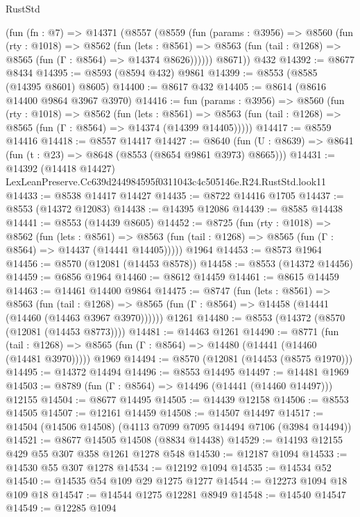 \begin{lexlean}{RustStd}
\begin{coremodule}
    (fun (fn : @7) =>
    @14371
      (@8557
        (@8559
          (fun (params : @3956) =>
          @8560
            (fun (rty : @1018) =>
            @8562
              (fun (lets : @8561) =>
              @8563 (fun (tail : @1268) => @8565 (fun (Γ : @8564) => @14374 @8626))))))
        @8671))
    @432
@14392 := @8677 @8434
@14395 := @8593 (@8594 @432) @9861
@14399 := @8553 (@8585 (@14395 @8601) @8605)
@14400 := @8617 @432
@14405 := @8614 (@8616 @14400 @9864 @3967 @3970)
@14416 := fun (params : @3956) =>
  @8560
    (fun (rty : @1018) =>
    @8562
      (fun (lets : @8561) =>
      @8563 (fun (tail : @1268) => @8565 (fun (Γ : @8564) => @14374 (@14399 @14405)))))
@14417 := @8559 @14416
@14418 := @8557 @14417
@14427 := @8640
    (fun (U : @8639) => @8641 (fun (t : @23) => @8648 (@8553 (@8654 @9861 @3973) @8665)))
@14431 := @14392
    (@14418 @14427)
    LexLeanPreserve.Cc639d244984595f0311043c4c505146e.R24.RustStd.look11
@14433 := @8538 @14417 @14427
@14435 := @8722 @14416 @1705
@14437 := @8553 (@14372 @12083)
@14438 := @14395 @12086
@14439 := @8585 @14438
@14441 := @8553 (@14439 @8605)
@14452 := @8725
    (fun (rty : @1018) =>
    @8562
      (fun (lets : @8561) =>
      @8563 (fun (tail : @1268) => @8565 (fun (Γ : @8564) => @14437 (@14441 @14405)))))
    @1964
@14453 := @8573 @1964
@14456 := @8570 (@12081 (@14453 @8578))
@14458 := @8553 (@14372 @14456)
@14459 := @6856 @1964
@14460 := @8612 @14459
@14461 := @8615 @14459
@14463 := @14461 @14400 @9864
@14475 := @8747
    (fun (lets : @8561) =>
    @8563
      (fun (tail : @1268) =>
      @8565 (fun (Γ : @8564) => @14458 (@14441 (@14460 (@14463 @3967 @3970))))))
    @1261
@14480 := @8553 (@14372 (@8570 (@12081 (@14453 @8773))))
@14481 := @14463 @1261
@14490 := @8771
    (fun (tail : @1268) => @8565 (fun (Γ : @8564) => @14480 (@14441 (@14460 (@14481 @3970)))))
    @1969
@14494 := @8570 (@12081 (@14453 (@8575 @1970)))
@14495 := @14372 @14494
@14496 := @8553 @14495
@14497 := @14481 @1969
@14503 := @8789 (fun (Γ : @8564) => @14496 (@14441 (@14460 @14497))) @12155
@14504 := @8677 @14495
@14505 := @14439 @12158
@14506 := @8553 @14505
@14507 := @12161 @14459
@14508 := @14507 @14497
@14517 := @14504 (@14506 @14508) (@4113 @7099 @7095 @14494 @7106 (@3984 @14494))
@14521 := @8677 @14505 @14508 (@8834 @14438)
@14529 := @14193 @12155 @429 @55 @307 @358 @1261 @1278 @548
@14530 := @12187 @1094
@14533 := @14530 @55 @307 @1278
@14534 := @12192 @1094
@14535 := @14534 @52
@14540 := @14535 @54 @109 @29 @1275 @1277
@14544 := @12273 @1094 @18 @109 @18
@14547 := @14544 @1275 @12281 @8949
@14548 := @14540 @14547
@14549 := @12285 @1094

\end{coremodule}
\end{lexlean}
